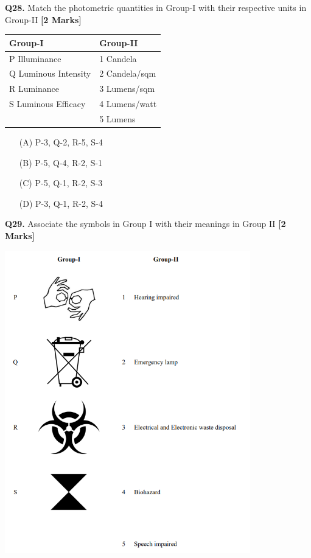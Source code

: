 \documentclass[11pt]{article}
\newcommand{\questionb}[2]{
    \noindent\textbf{Q#2.} #1 \hfill \textbf{[2 Marks]}
}
\begin{document}
\questionb{Match the photometric quantities in Group-I with their respective units in Group-II}{28}
\begin{tabularx}{\textwidth}{|l|X|}
\hline
\textbf{Group-I} & \textbf{Group-II} \\
\hline
P Illuminance & 1 Candela \\
Q Luminous Intensity & 2 Candela/sqm \\
R Luminance & 3 Lumens/sqm \\
S Luminous Efficacy & 4 Lumens/watt \\
 & 5 Lumens \\
\hline
\end{tabularx}
\begin{enumerate}
    \item[(A)] P-3, Q-2, R-5, S-4
    \item[(B)] P-5, Q-4, R-2, S-1
    \item[(C)] P-5, Q-1, R-2, S-3
    \item[(D)] P-3, Q-1, R-2, S-4
\end{enumerate}
\vspace{0.5cm}

\questionb{Associate the symbols in Group I with their meanings in Group II}{29}
\begin{center}
\includegraphics[width=0.8\textwidth]{figures/29.png}
\end{center}
\end{document}
